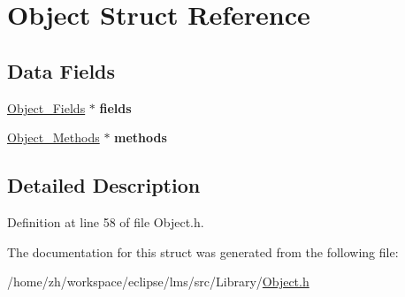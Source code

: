 \hypertarget{structObject}{\section{Object Struct Reference}
\label{structObject}
}
\subsection*{Data Fields}
\begin{DoxyCompactItemize}
\item 
\hypertarget{structObject_a369e7a2e56076d2670c696e1ac2faf56}{\hyperlink{structObject__Fields}{Object\-\_\-\-Fields} $\ast$ {\bfseries fields}}\label{structObject_a369e7a2e56076d2670c696e1ac2faf56}

\item 
\hypertarget{structObject_a3b998dc0f86cbf3e38092067773b1f12}{\hyperlink{structObject__Methods}{Object\-\_\-\-Methods} $\ast$ {\bfseries methods}}\label{structObject_a3b998dc0f86cbf3e38092067773b1f12}

\end{DoxyCompactItemize}


\subsection{Detailed Description}


Definition at line 58 of file Object.\-h.



The documentation for this struct was generated from the following file\-:\begin{DoxyCompactItemize}
\item 
/home/zh/workspace/eclipse/lms/src/\-Library/\hyperlink{Object_8h}{Object.\-h}\end{DoxyCompactItemize}
